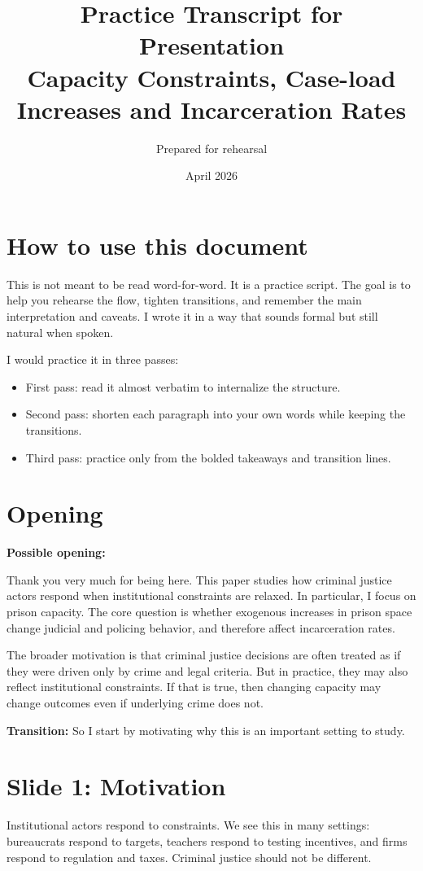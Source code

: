 \documentclass[11pt]{article}
\title{Practice Transcript for Presentation \\ \large Capacity Constraints, Case-load Increases and Incarceration Rates}
\author{Prepared for rehearsal}
\date{April 2026}
\begin{document}
\maketitle
\onehalfspacing

\section*{How to use this document}
This is not meant to be read word-for-word. It is a practice script. The goal is to help you rehearse the flow, tighten transitions, and remember the main interpretation and caveats. I wrote it in a way that sounds formal but still natural when spoken.

I would practice it in three passes:
\begin{itemize}[leftmargin=1.5em]
    \item First pass: read it almost verbatim to internalize the structure.
    \item Second pass: shorten each paragraph into your own words while keeping the transitions.
    \item Third pass: practice only from the bolded takeaways and transition lines.
\end{itemize}

\section{Opening}
\textbf{Possible opening:}

Thank you very much for being here. This paper studies how criminal justice actors respond when institutional constraints are relaxed. In particular, I focus on prison capacity. The core question is whether exogenous increases in prison space change judicial and policing behavior, and therefore affect incarceration rates.

The broader motivation is that criminal justice decisions are often treated as if they were driven only by crime and legal criteria. But in practice, they may also reflect institutional constraints. If that is true, then changing capacity may change outcomes even if underlying crime does not.

\textbf{Transition:} So I start by motivating why this is an important setting to study.

\section{Slide 1: Motivation}
Institutional actors respond to constraints. We see this in many settings: bureaucrats respond to targets, teachers respond to testing incentives, and firms respond to regulation and taxes. Criminal justice should not be different.
\end{document}
